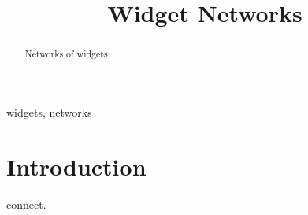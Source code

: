 \documentclass[conference]{IEEEtran}
\begin{document}
\title{Widget Networks}
\author{
\and
{}
}
\maketitle
\begin{abstract}
Networks of widgets.
\end{abstract}
\begin{IEEEkeywords}
widgets, networks
\end{IEEEkeywords}
\section{Introduction}
 connect.
\end{document}
